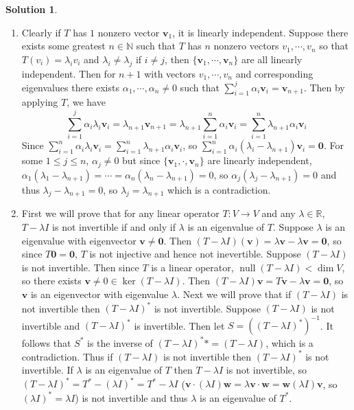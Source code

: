 \documentclass[11pt]{article}
\theoremstyle{definition}
\newtheorem*{solution}{Solution}
\newcommand{\R}{\mathbb{R}}
\newcommand{\N}{\mathbb{N}}
\DeclareMathOperator{\nul}{null}
\newcommand{\vv}{\mathbf{v}}
\newcommand{\vw}{\mathbf{w}}
\newcommand{\vzero}{\mathbf{0}}
\begin{document}
    \begin{solution}
        \begin{enumerate}[label = \alph*)]
            \item Clearly if $T$ has $1$ nonzero vector $\vv_1$, it is linearly independent. Suppose there exists some greatest $n \in \N$ such that $T$ has $n$ nonzero vectors $v_1, \cdots, v_n$ so that $T(v_i) = \lambda_iv_i$ and $\lambda_i \neq \lambda_j$ if $i \neq j$, then $\{\vv_1, \cdots, \vv_n\}$ are all linearly independent. Then for $n + 1$ with vectors $v_1, \cdots, v_n$ and corresponding eigenvalues there exists $\alpha_1, \cdots, \alpha_n \neq 0$ such that $\sum_{i = 1}^j \alpha_i \vv_i = \vv_{n+1}$. Then by applying $T$, we have $$\sum_{i = 1}^j \alpha_i \lambda_i\vv_i = \lambda_{n+1}\vv_{n+1} = \lambda_{n+1} \sum_{i=1}^n \alpha_i \vv_i = \sum_{i=1}^n \lambda_{n+1}\alpha_i \vv_i$$Since $\sum_{i = 1}^n \alpha_i \lambda_i\vv_i = \sum_{i=1}^n \lambda_{n+1}\alpha_i \vv_i$, so $\sum_{i = 1}^n \alpha_i (\lambda_i - \lambda_{n+1}) \vv_i = \vzero$. For some $1 \le j \le n$, $\alpha_j \neq 0$ but since $\{\vv_1, \cdot, \vv_n\}$ are linearly independent, $\alpha_1 (\lambda_1 - \lambda_{n+1}) = \cdots = \alpha_n (\lambda_n - \lambda_{n+1}) = 0$, so $\alpha_j (\lambda_j - \lambda_{n+1}) = 0$ and thus $\lambda_j - \lambda_{n+1} = 0$, so $\lambda_j = \lambda_{n+1}$ which is a contradiction.
            \item First we will prove that for any linear operator $T: V \to V$ and any $\lambda \in \R$, $T- \lambda I$ is not invertible if and only if $\lambda$ is an eigenvalue of $T$. Suppose $\lambda$ is an eigenvalue with eigenvector $\vv \neq \vzero$. Then $(T-\lambda I)(\vv) = \lambda \vv - \lambda \vv = \vzero$, so since $T\vzero = \vzero$, $T$ is not injective and hence not inevertible. Suppose $(T - \lambda I)$ is not invertible. Then since $T$ is a linear operator, $\nul (T - \lambda I) < \dim V$, so there exists $\vv \neq 0 \in \ker (T - \lambda I)$. Then $(T - \lambda I)\vv = T\vv - \lambda \vv = \vzero$, so $\vv$ is an eigenvector with eigenvalue $\lambda$. Next we will prove that if $(T-\lambda I)$ is not invertible then $(T-\lambda I)^*$ is not invertible. Suppose $(T-\lambda I)$ is not invertible and $(T-\lambda I)^*$ is invertible. Then let $S = ((T-\lambda I)^*)^{-1}$. It follows that $S^*$ is the inverse of $(T-\lambda I)^** = (T-\lambda I)$, which is a contradiction. Thus if $(T-\lambda I)$ is not invertible then $(T-\lambda I)^*$ is not invertible. If $\lambda$ is an eigenvalue of $T$ then $T - \lambda I$ is not invertible, so $(T - \lambda I)^* = T^* - (\lambda I)^* = T^* - \lambda I$ ($\vv\cdot (\lambda I)\vw = \lambda \vv \cdot \vw = \vw (\lambda I) \vv$, so $(\lambda I)^* = \lambda I$) is not invertible and thus $\lambda$ is an eigenvalue of $T^*$.

\end{enumerate}
\end{solution}
\end{document}
